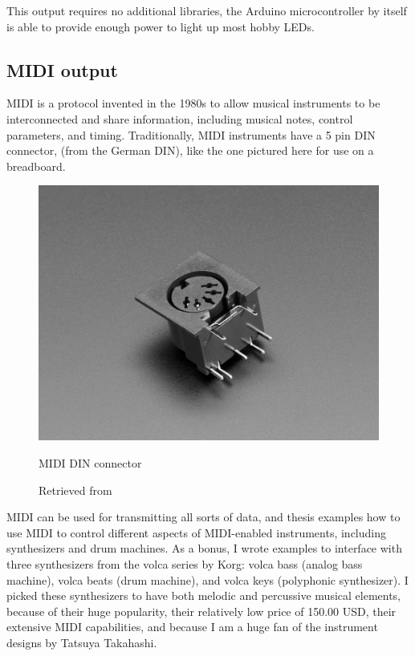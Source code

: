 This output requires no additional libraries, the Arduino microcontroller by itself is able to provide enough power to light up most hobby LEDs.

\subsection{MIDI output}

\acrfull{MIDI} is a protocol invented in the 1980s to allow musical instruments to be interconnected and share information, including musical notes, control parameters, and timing. Traditionally, MIDI instruments have a 5 pin  \acrshort{DIN} connector, (from the German \acrlong{DIN}), like the one pictured here for use on a breadboard.

\begin{figure}[ht]
  \centering
  \includegraphics[width=0.75\linewidth,height=0.25\textheight,keepaspectratio]{images/materials-adafruit-midi-jack.jpg}
  \caption{MIDI DIN connector}
  \caption*{Retrieved from \cite{website-materials-adafruit-midi-jack}}
  \label{fig:materials-adafruit-midi-jack}
\end{figure}

MIDI can be used for transmitting all sorts of data, and thesis examples how to use MIDI to control different aspects of MIDI-enabled instruments, including synthesizers and drum machines. As a bonus, I wrote examples to interface with three synthesizers from the volca series by Korg: volca bass (analog bass machine), volca beats (drum machine), and volca keys (polyphonic synthesizer). I picked these synthesizers to have both melodic and percussive musical elements, because of their huge popularity, their relatively low price of 150.00 USD, their extensive MIDI capabilities, and because I am a huge fan of the instrument designs by Tatsuya Takahashi.

